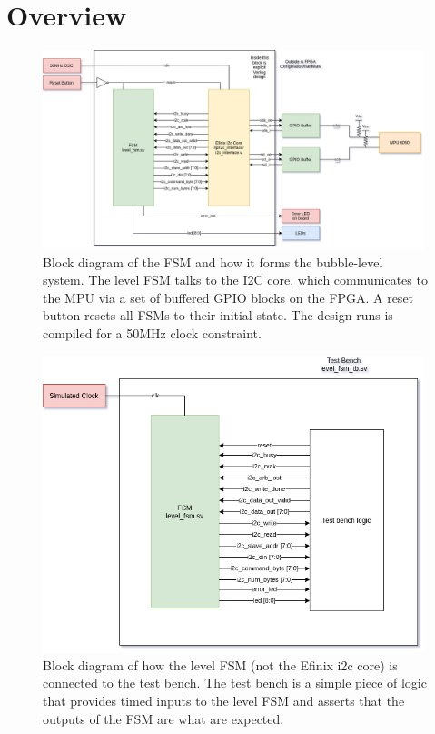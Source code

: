 \documentclass[11pt]{article}
\begin{document}
\section{Overview}
\begin{figure}[H]
    \centering
\includegraphics[width=0.99\textwidth]{fsm.png}
    \caption{Block diagram of the FSM and how it forms the bubble-level system. The level FSM talks to the I2C core, which communicates to the MPU via a set of buffered GPIO blocks on the FPGA. A reset button resets all FSMs to their initial state. The design runs is compiled for a 50MHz clock constraint.}
    \label{fig:foobar}
\end{figure}

\begin{figure}[H]
    \centering
\includegraphics[width=0.99\textwidth]{tb.png}
    \caption{Block diagram of how the level FSM (not the Efinix i2c core) is connected to the test bench. The test bench is a simple piece of logic that provides timed inputs to the level FSM and asserts that the outputs of the FSM are what are expected.}
    \label{fig:foobar}
\end{figure}
\end{document}
